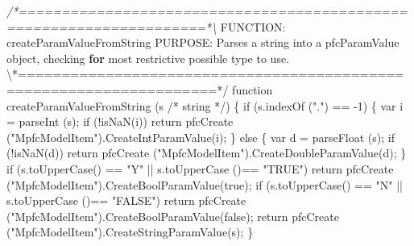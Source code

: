 \documentclass[]{article}
\newenvironment{Shaded}{}{}
\newcommand{\KeywordTok}[1]{\textcolor[rgb]{0.00,0.44,0.13}{\textbf{{#1}}}}
\newcommand{\FloatTok}[1]{\textcolor[rgb]{0.25,0.63,0.44}{{#1}}}
\newcommand{\CommentTok}[1]{\textcolor[rgb]{0.38,0.63,0.69}{\textit{{#1}}}}
\newcommand{\OtherTok}[1]{\textcolor[rgb]{0.00,0.44,0.13}{{#1}}}
\newcommand{\NormalTok}[1]{{#1}}
\begin{document}
\begin{Shaded}
\begin{Highlighting}[]
\CommentTok{/*====================================================================*\textbackslash{}}
\NormalTok{FUNCTION: createParamValueFromString}
\NormalTok{PURPOSE:  Parses a string into a pfcParamValue object, checking }\KeywordTok{for} \NormalTok{most }
        \NormalTok{restrictive possible type to }\OtherTok{use}\NormalTok{.}
\NormalTok{\textbackslash{}*====================================================================*}\OtherTok{/    }
\OtherTok{function createParamValueFromString }\FloatTok{(}\OtherTok{s /}\NormalTok{* string *}\OtherTok{/}\FloatTok{)}
\OtherTok{\{}
\OtherTok{  if }\FloatTok{(}\OtherTok{s.indexOf }\FloatTok{(}\OtherTok{"."}\FloatTok{)}\OtherTok{ == -1}\FloatTok{)}
\OtherTok{    \{}
\OtherTok{      var i = parseInt }\FloatTok{(}\OtherTok{s}\FloatTok{)}\OtherTok{;}
\OtherTok{      if }\FloatTok{(}\OtherTok{!isNaN}\FloatTok{(}\OtherTok{i}\FloatTok{))}
\OtherTok{    return pfcCreate }\FloatTok{(}\OtherTok{"MpfcModelItem"}\FloatTok{)}\OtherTok{.CreateIntParamValue}\FloatTok{(}\OtherTok{i}\FloatTok{)}\OtherTok{;}
\OtherTok{    \}}
\OtherTok{  else}
\OtherTok{    \{}
\OtherTok{      var d = parseFloat }\FloatTok{(}\OtherTok{s}\FloatTok{)}\OtherTok{;}
\OtherTok{      if }\FloatTok{(}\OtherTok{!isNaN}\FloatTok{(}\OtherTok{d}\FloatTok{))}
\OtherTok{    return pfcCreate }\FloatTok{(}\OtherTok{"MpfcModelItem"}\FloatTok{)}\OtherTok{.CreateDoubleParamValue}\FloatTok{(}\OtherTok{d}\FloatTok{)}\OtherTok{;}
\OtherTok{    \}}
\OtherTok{  if }\FloatTok{(}\OtherTok{s.toUpperCase}\FloatTok{()}\OtherTok{ == "Y" }\FloatTok{||}\OtherTok{ s.toUpperCase }\FloatTok{()}\OtherTok{== "TRUE"}\FloatTok{)}
\OtherTok{    return pfcCreate }\FloatTok{(}\OtherTok{"MpfcModelItem"}\FloatTok{)}\OtherTok{.CreateBoolParamValue}\FloatTok{(}\OtherTok{true}\FloatTok{)}\OtherTok{;}
\OtherTok{  }
\OtherTok{  if }\FloatTok{(}\OtherTok{s.toUpperCase}\FloatTok{()}\OtherTok{ == "N" }\FloatTok{||}\OtherTok{ s.toUpperCase }\FloatTok{()}\OtherTok{== "FALSE"}\FloatTok{)}
\OtherTok{    return pfcCreate }\FloatTok{(}\OtherTok{"MpfcModelItem"}\FloatTok{)}\OtherTok{.CreateBoolParamValue}\FloatTok{(}\OtherTok{false}\FloatTok{)}\OtherTok{;}
\OtherTok{  }
\OtherTok{  return pfcCreate }\FloatTok{(}\OtherTok{"MpfcModelItem"}\FloatTok{)}\OtherTok{.CreateStringParamValue}\FloatTok{(}\OtherTok{s}\FloatTok{)}\OtherTok{;}
\OtherTok{\}}

\OtherTok{                    }
\OtherTok{    }
\end{Highlighting}
\end{Shaded}
\end{document}
